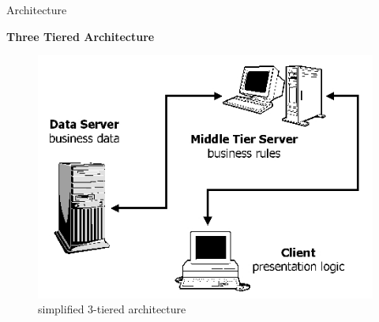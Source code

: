 \documentclass[11pt]{beamer}
\begin{document}
\begin{frame}{Architecture}
\begin{flushleft}
	\textbf{Three Tiered Architecture}
	\pause
	\begin{figure}
	\includegraphics[scale=0.4]{3508f3.jpg} 
	\caption{simplified 3-tiered architecture}
	\end{figure}
	
\end{flushleft}
\end{frame}
\end{document}
